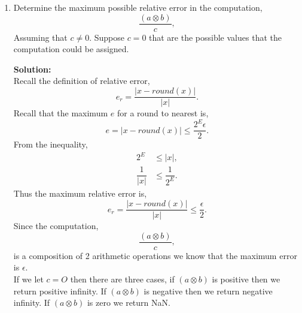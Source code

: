 \documentclass[12pt]{article}
\makeatletter
\theoremstyle{homework}
\newenvironment{exercise}[1]
{\def\@currentlabel{#1}\exercisecore}
{\endexercisecore}
\newcommand{\localhead}[1]{\par\smallskip\noindent\textbf{#1}\nobreak\\}%
\newcommand\solution{\localhead{Solution:}}
\makeatother
\begin{document}
\begin{exercise} {Problem 5.9}
\begin{enumerate}
\item Determine the maximum possible relative error in the computation,
\begin{equation*}
  \dfrac{(a \otimes b)}{c},
\end{equation*}
Assuming that $c \neq 0$. Suppose $c = 0$ that are the possible values that the computation could be assigned. \\
\solution
Recall the definition of relative error,
\begin{equation*}
  e_r = \dfrac{|x -round(x)|}{|x|}.
\end{equation*}
Recall that the maximum $e$ for a round to nearest is,
\begin{equation*}
  e = |x -round(x)| \le \dfrac{2^E\epsilon}{2}.
\end{equation*}
From the inequality,
\begin{align*}
 2^E &\le |x|,\\
\dfrac{1}{|x|} &\le \dfrac{1}{2^E}.
\end{align*}
Thus the maximum relative error is,
\begin{equation*}
  e_r = \dfrac{|x -round(x)|}{|x|} \le \dfrac{\epsilon}{2}.
\end{equation*}
Since the computation,
\begin{equation*}
  \dfrac{(a \otimes b)}{c},
\end{equation*}
is a composition of 2 arithmetic operations we know that the maximum error is $\epsilon$.\\

If we let $c = O$ then there are three cases, if $(a \otimes b)$ is positive then we return positive infinity. If $(a \otimes b)$ is negative then we return negative infinity. If $(a \otimes b)$ is zero we return NaN.  
  \end{enumerate}
\end{exercise}
\vspace{.5in}
\end{document}
